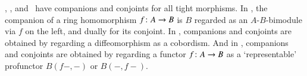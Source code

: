 
\begin{egs}
  \lMod, \lnCob, and \lProf\ have companions and conjoints for all tight morphisms.  In \lMod, the companion
  of a ring homomorphism $f\colon A\to B$ is $B$ regarded as an
  $A$-$B$-bimodule via $f$ on the left, and dually for its conjoint.
  In \lnCob, companions and conjoints are obtained by regarding a
  diffeomorphism as a cobordism.  And in \lProf, companions and
  conjoints are obtained by regarding a functor $f\colon A\to B$ as a
  `representable' profunctor $B(f-,-)$ or $B(-,f-)$.
\end{egs}

